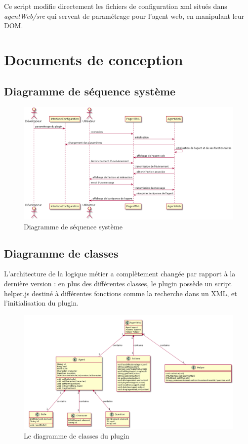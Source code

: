 \documentclass[11pt,dvipsnames,svgnames]{report}
\begin{document}
	Ce script modifie directement les fichiers de configuration xml situés dans \emph{agentWeb/src} qui servent de paramétrage pour l'agent web, en manipulant leur DOM.
	
	\chapter{Documents de conception}
	
	\section{Diagramme de séquence système}
	\begin{figure}[H]
\centerline{\includegraphics[width=1.2\textwidth]{images/seq_diagram.png}}
\caption{Diagramme de séquence système}
\end{figure}	
	
	\section{Diagramme de classes}
	L'architecture de la logique métier a complètement changée par rapport à la dernière version : en plus des différentes classes, le plugin possède un script helper.js destiné à différentes fonctions comme la recherche dans un XML, et l'initialisation du plugin.\\
	\begin{figure}[H]
\centerline{\includegraphics[width=1.2\textwidth]{images/class_diagram.png}}
\caption{Le diagramme de classes du plugin}
\end{figure} 
\end{document}

